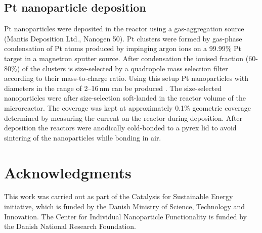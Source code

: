 \documentclass[journal=jacsat,manuscript=article]{achemso}
\begin{document}
\subsection{Pt nanoparticle deposition}
Pt nanoparticles were deposited in the reactor using a gas-aggregation source
(Mantis Deposition Ltd., Nanogen 50). Pt clusters were formed by gas-phase
condensation of Pt atoms produced by impinging argon ions on a 99.99\% Pt
target in a magnetron sputter source. After condensation the ionised fraction
(60-80\%) of the clusters is size-selected by a quadropole mass selection
filter according to their mass-to-charge ratio. Using this setup Pt
nanoparticles with diameters in the range of 2--16\,nm can be produced
\cite{Nielsen2010,Nielsen2009}. The size-selected nanoparticles were after
size-selection soft-landed in the reactor volume of the microreactor. The
coverage was kept at approximately 0.1\% geometric coverage determined by
measuring the current on the reactor during deposition. After deposition the
reactors were anodically cold-bonded \cite{Vesborg2010} to a pyrex lid to avoid
sintering of the nanoparticles while bonding in air.

\section{Acknowledgments}
This work was carried out as part of the Catalysis for Sustainable Energy
initiative, which is funded by the Danish Ministry of Science, Technology and
Innovation. The Center for Individual Nanoparticle Functionality is funded by
the Danish National Research Foundation.


\end{document}
